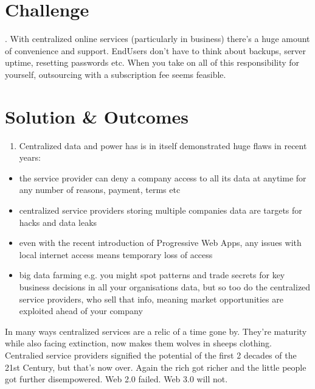 \documentclass[letterpaper,10pt,openany,oneside,english]{sphinxmanual}
\begin{document}
\section{Challenge}
\label{\detokenize{executivesummary:challenge}}
. With centralized online services (particularly in business) there’s a huge amount of convenience and support. End\sphinxhyphen{}Users don’t have to think about backups, server uptime, resetting passwords etc.
When you take on all of this responsibility for yourself, outsourcing with a subscription fee seems feasible.


\section{Solution \& Outcomes}
\label{\detokenize{executivesummary:solution-outcomes}}\begin{enumerate}
%
\item {} 
\sphinxAtStartPar
Centralized data and power has is in itself demonstrated huge flaws in recent years:

\end{enumerate}
\begin{itemize}
\item {} 
\sphinxAtStartPar
the service provider can deny a company access to all its data at anytime for any number of reasons, payment, terms etc

\item {} 
\sphinxAtStartPar
centralized service providers storing multiple companies data are targets for hacks and data leaks

\item {} 
\sphinxAtStartPar
even with the recent introduction of Progressive Web Apps, any issues with local internet access means temporary loss of access

\item {} 
\sphinxAtStartPar
big data farming e.g. you might spot patterns and trade secrets for key business decisions in all your organisations data,
but so too do the centralized service providers, who sell that info, meaning market opportunities are exploited ahead of your company

\end{itemize}

\sphinxAtStartPar
In many ways centralized services are a relic of a time gone by.
They’re maturity while also facing extinction, now makes them wolves in sheeps clothing.
Centralied service providers signified the potential of the first 2 decades of the 21st Century, but that’s now over.
Again the rich got richer and the little people got further disempowered. Web 2.0 failed. Web 3.0 will not.
\end{document}
